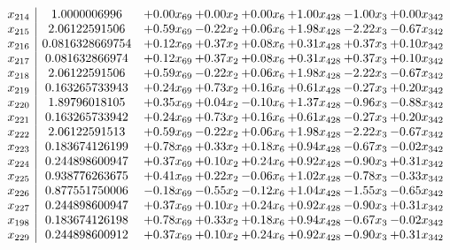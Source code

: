 \documentclass[8pt]{article}
\begin{document}
\[\begin{array}{c| c c@{\hskip 2pt} c@{\hskip 2pt} c@{\hskip 2pt} c@{\hskip 2pt} c@{\hskip 2pt} c@{\hskip 2pt} }
 x_{214}   &  1.0000006996 & +  0.00 x_{69} & +  0.00 x_{2} & +  0.00 x_{6} & +  1.00 x_{428} & -1.00 x_{3} & +  0.00 x_{342}\\
 x_{215}   &  2.06122591506 & +  0.59 x_{69} & -0.22 x_{2} & +  0.06 x_{6} & +  1.98 x_{428} & -2.22 x_{3} & -0.67 x_{342}\\
 x_{216}   &  0.0816328669754 & +  0.12 x_{69} & +  0.37 x_{2} & +  0.08 x_{6} & +  0.31 x_{428} & +  0.37 x_{3} & +  0.10 x_{342}\\
 x_{217}   &  0.081632866974 & +  0.12 x_{69} & +  0.37 x_{2} & +  0.08 x_{6} & +  0.31 x_{428} & +  0.37 x_{3} & +  0.10 x_{342}\\
 x_{218}   &  2.06122591506 & +  0.59 x_{69} & -0.22 x_{2} & +  0.06 x_{6} & +  1.98 x_{428} & -2.22 x_{3} & -0.67 x_{342}\\
 x_{219}   &  0.163265733943 & +  0.24 x_{69} & +  0.73 x_{2} & +  0.16 x_{6} & +  0.61 x_{428} & -0.27 x_{3} & +  0.20 x_{342}\\
 x_{220}   &  1.89796018105 & +  0.35 x_{69} & +  0.04 x_{2} & -0.10 x_{6} & +  1.37 x_{428} & -0.96 x_{3} & -0.88 x_{342}\\
 x_{221}   &  0.163265733942 & +  0.24 x_{69} & +  0.73 x_{2} & +  0.16 x_{6} & +  0.61 x_{428} & -0.27 x_{3} & +  0.20 x_{342}\\
 x_{222}   &  2.06122591513 & +  0.59 x_{69} & -0.22 x_{2} & +  0.06 x_{6} & +  1.98 x_{428} & -2.22 x_{3} & -0.67 x_{342}\\
 x_{223}   &  0.183674126199 & +  0.78 x_{69} & +  0.33 x_{2} & +  0.18 x_{6} & +  0.94 x_{428} & -0.67 x_{3} & -0.02 x_{342}\\
 x_{224}   &  0.244898600947 & +  0.37 x_{69} & +  0.10 x_{2} & +  0.24 x_{6} & +  0.92 x_{428} & -0.90 x_{3} & +  0.31 x_{342}\\
 x_{225}   &  0.938776263675 & +  0.41 x_{69} & +  0.22 x_{2} & -0.06 x_{6} & +  1.02 x_{428} & -0.78 x_{3} & -0.33 x_{342}\\
 x_{226}   &  0.877551750006 & -0.18 x_{69} & -0.55 x_{2} & -0.12 x_{6} & +  1.04 x_{428} & -1.55 x_{3} & -0.65 x_{342}\\
 x_{227}   &  0.244898600947 & +  0.37 x_{69} & +  0.10 x_{2} & +  0.24 x_{6} & +  0.92 x_{428} & -0.90 x_{3} & +  0.31 x_{342}\\
 x_{198}   &  0.183674126198 & +  0.78 x_{69} & +  0.33 x_{2} & +  0.18 x_{6} & +  0.94 x_{428} & -0.67 x_{3} & -0.02 x_{342}\\
 x_{229}   &  0.244898600912 & +  0.37 x_{69} & +  0.10 x_{2} & +  0.24 x_{6} & +  0.92 x_{428} & -0.90 x_{3} & +  0.31 x_{342}\\

\end{array}\]
\end{document}
